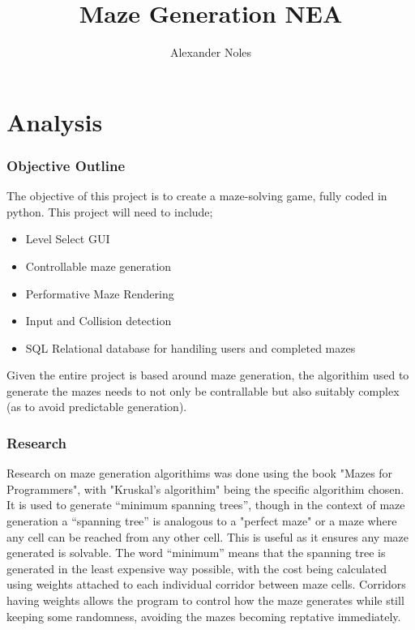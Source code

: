 \documentclass{article}
\date{}
\title{Maze Generation NEA}
\author{Alexander Noles}
\begin{document}
\maketitle
\thispagestyle{empty}



\clearpage{}

\fontsize{12}{13}\selectfont
\setcounter{tocdepth}{1}
\tableofcontents
 
\clearpage
\part{Analysis}

\section{Objective Outline}
The objective of this project is to create a maze-solving game, fully coded in python. This project will need to include; 
\begin{itemize}
\item Level Select GUI
\item Controllable maze generation
\item Performative Maze Rendering
\item Input and Collision detection
\item SQL Relational database for handiling users and completed mazes
\end{itemize}
Given the entire project is based around maze generation, the algorithim used to generate the mazes needs to not only be contrallable
but also suitably complex (as to avoid predictable generation).

\section{Research}
Research on maze generation algorithims was done using the book "Mazes for Programmers", with "Kruskal's algorithim" being the specific algorithim
chosen. It is used to generate ``minimum spanning trees'', though in the context of maze generation a ``spanning tree'' is analogous to a "perfect maze" or
a maze where any cell can be reached from any other cell. This is useful as it ensures any maze generated is solvable. The word ``minimum'' means that the 
spanning tree is generated in the least expensive way possible, with the cost being calculated using weights attached to each individual corridor between maze
cells. Corridors having weights allows the program to control how the maze generates while still keeping some randomness, avoiding the mazes becoming reptative immediately.
\end{document}
